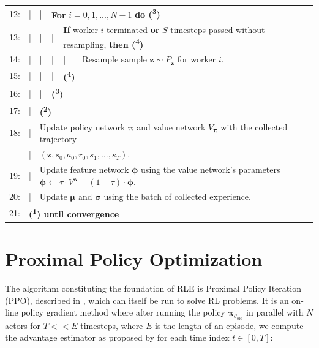 {\begin{table}[h!]
\begin{tabular}{rlllll}
    12: & | & | & \multicolumn{3}{l}{\textbf{For} $i = 0, 1, ..., N-1$ \textbf{do (\textsuperscript{3})}}\\
    13: & | & | & | & \multicolumn{2}{l}{\textbf{If} worker $i$ terminated \textbf{or} $S$ timesteps passed without resampling, \textbf{then (\textsuperscript{4})}}\\
    14: & | & | & | & | & Resample sample $\textbf{z} \sim P_{\textbf{z}}$ for worker $i$.\\
    15: & | & | & | & \multicolumn{2}{l}{\textbf{(\textsuperscript{4})}}\\
    16: & | & | & \multicolumn{3}{l}{\textbf{(\textsuperscript{3})}}\\
    17: & | & \multicolumn{4}{l}{\textbf{(\textsuperscript{2})}}\\
    18: & | & \multicolumn{4}{l}{Update policy network $\boldsymbol{\pi}$ and value network $V_{\boldsymbol{\pi}}$ with the collected trajectory}\\
    & | & \multicolumn{4}{l}{$(\textbf{z}, s_{0}, a_{0}, r_{0}, s_{1}, ..., s_{T})$.}\\
    19: & | & \multicolumn{4}{l}{Update feature network $\boldsymbol{\phi}$ using the value network's parameters $\boldsymbol{\phi} \leftarrow \tau \cdot V^{\boldsymbol{\pi}} + (1 - \tau) \cdot \boldsymbol{\phi}$.}\\
    20: & | & \multicolumn{4}{l}{Update $\boldsymbol{\mu}$ and $\boldsymbol{\sigma}$ using the batch of collected experience.}\\
    21: & \multicolumn{5}{l}{\textbf{(\textsuperscript{1}) until convergence}}\\
    \hline\hline
  \end{tabular}
\end{table}}

\clearpage
\hypertarget{algo-ppo}{\section{Proximal Policy Optimization}}

\noindent The algorithm constituting the foundation of \textsc{RLE} is Proximal Policy Iteration (\textsc{PPO}), described in \cite{ppo-paper}, which can itself be run to solve RL problems. It is an on-line policy gradient method where after running the policy $\boldsymbol{\pi}_{\theta_{\text{old}}}$ in parallel with $N$ actors for $T << E$ timesteps, where $E$ is the length of an episode, we compute the advantage estimator as proposed by \cite{generalized-advantage-estimation-paper} for each time index $t \in [0, T]$:

